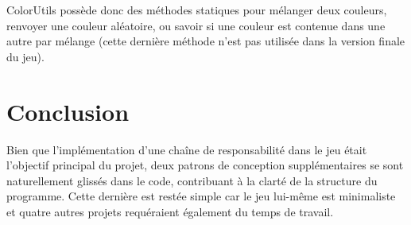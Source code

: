 \documentclass[11pt,a4paper,twoside,svgnames]{article}
\begin{document}
ColorUtils possède donc des méthodes statiques pour mélanger deux couleurs, renvoyer une couleur aléatoire, ou savoir si une couleur est contenue dans une autre par mélange (cette dernière méthode n'est pas utilisée dans la version finale du jeu).

\clearpage

\section{Conclusion}
Bien que l'implémentation d'une chaîne de responsabilité dans le jeu était l'objectif principal du projet, deux patrons de conception supplémentaires se sont naturellement glissés dans le code, contribuant à la clarté de la structure du programme. Cette dernière est restée simple car le jeu lui-même est minimaliste et quatre autres projets requéraient également du temps de travail.
\end{document}
